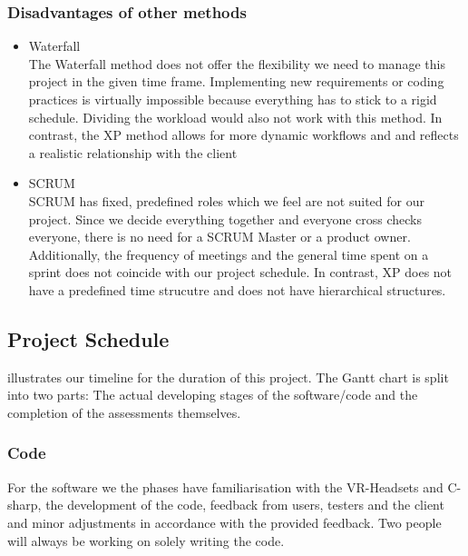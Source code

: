 \documentclass[coverpage,lineno]{../custom}
\begin{document}
\subsubsection{Disadvantages of other methods}
\begin{itemize}
    \item Waterfall \\
    The Waterfall method does not offer the flexibility we need to manage this project in the given time frame. Implementing new requirements or coding practices is virtually impossible because everything has to stick to a rigid schedule. Dividing the workload would also not work with this method. In contrast, the XP method allows for more dynamic workflows and and reflects a realistic relationship with the client
    \item SCRUM \\
    SCRUM has fixed, predefined roles which we feel are not suited for our project. Since we decide everything together and everyone cross checks everyone, there is no need for a SCRUM Master or a product owner. Additionally, the frequency of meetings and the general time spent on a sprint does not coincide with our project schedule. In contrast, XP does not have a predefined time strucutre and does not have hierarchical structures.   
    
    
\end{itemize}

\subsection{Project Schedule}
\label{ssec:schedule}

 illustrates our timeline for the duration of this project. The Gantt chart is split into two parts: The actual developing stages of the software/code and the completion of the assessments themselves. 
\subsubsection{Code}
For the software we the phases have familiarisation with the VR-Headsets and C-sharp, the development of the code, feedback from users, testers and the client and minor adjustments in accordance with the provided feedback. Two people will always be working on solely writing the code. 
\end{document}
